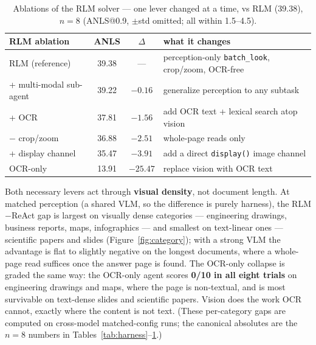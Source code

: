 \begin{table}[t]
\centering
\footnotesize
{\setlength{\tabcolsep}{4pt}
\begin{tabular}{lccp{1.7cm}}
\toprule
RLM ablation & ANLS & $\Delta$ & what it changes \\
\midrule
RLM (reference) & 39.38 & --- & perception-only \texttt{batch\_look}, crop/zoom, OCR-free \\
+ multi-modal sub-agent & 39.22 & $-0.16$ & generalize perception to any subtask \\
+ OCR & 37.81 & $-1.56$ & add OCR text + lexical search atop vision \\
$-$ crop/zoom & 36.88 & $-2.51$ & whole-page reads only \\
+ display channel & 35.47 & $-3.91$ & add a direct \texttt{display()} image channel \\
OCR-only & 13.91 & $-25.47$ & replace vision with OCR text \\
\bottomrule
\end{tabular}}
\caption{Ablations of the RLM solver --- one lever changed at a time, vs RLM (39.38), $n{=}8$ (ANLS@0.9, $\pm$std omitted; all within 1.5--4.5).}
\label{tab:ablation}
\end{table}

Both necessary levers act through \textbf{visual density}, not document length. At matched perception (a shared VLM, so the difference is purely harness), the RLM$-$ReAct gap is largest on visually dense categories --- engineering drawings, business reports, maps, infographics --- and smallest on text-linear ones --- scientific papers and slides (Figure~\ref{fig:category}); with a strong VLM the advantage is flat to slightly negative on the longest documents, where a whole-page read suffices once the answer page is found. The OCR-only collapse is graded the same way: the OCR-only agent scores \textbf{0/10 in all eight trials} on engineering drawings and maps, where the page is non-textual, and is most survivable on text-dense slides and scientific papers. Vision does the work OCR cannot, exactly where the content is not text. (These per-category gaps are computed on cross-model matched-config runs; the canonical absolutes are the $n{=}8$ numbers in Tables~\ref{tab:harness}--\ref{tab:ablation}.)




